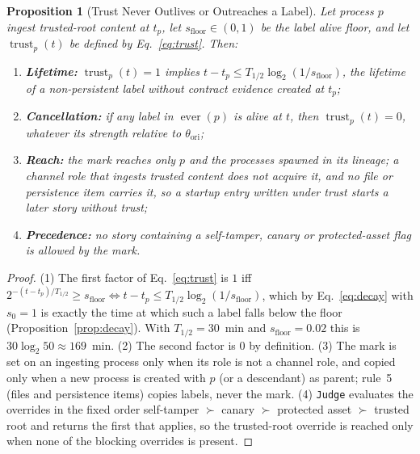 \documentclass[10pt,twocolumn,letterpaper]{article}
\makeatletter
\theoremstyle{plain}
\newtheorem{proposition}[theorem]{Proposition}
\theoremstyle{definition}
\theoremstyle{remark}
\DeclareRobustCommand{\_}{\ifmmode\nfss@text{\textunderscore}\else\textunderscore\penalty\@highpenalty\hskip\z@skip\fi}
\makeatother
\begin{document}
\begin{proposition}[Trust Never Outlives or Outreaches a Label]
\label{prop:trust}
Let process $p$ ingest trusted-root content at $t_p$, let $s_{\text{floor}} \in (0, 1)$ be the label alive floor, and let $\operatorname{trust}_p(t)$ be defined by Eq.~\eqref{eq:trust}. Then:
\begin{enumerate}[leftmargin=1.5em,itemsep=1pt,topsep=2pt]
  \item \textbf{Lifetime:} $\operatorname{trust}_p(t) = 1$ implies $t - t_p \le T_{1/2}\log_2(1/s_{\text{floor}})$, the lifetime of a non-persistent label without contract evidence created at $t_p$;
  \item \textbf{Cancellation:} if any label in $\operatorname{ever}(p)$ is alive at $t$, then $\operatorname{trust}_p(t) = 0$, whatever its strength relative to $\theta_{\text{ori}}$;
  \item \textbf{Reach:} the mark reaches only $p$ and the processes spawned in its lineage; a channel role that ingests trusted content does not acquire it, and no file or persistence item carries it, so a startup entry written under trust starts a later story without trust;
  \item \textbf{Precedence:} no story containing a self-tamper, canary or protected-asset flag is allowed by the mark.
\end{enumerate}
\end{proposition}
\begin{proof}
(1) The first factor of Eq.~\eqref{eq:trust} is $1$ iff $2^{-(t - t_p)/T_{1/2}} \ge s_{\text{floor}} \iff t - t_p \le T_{1/2}\log_2(1/s_{\text{floor}})$, which by Eq.~\eqref{eq:decay} with $s_0 = 1$ is exactly the time at which such a label falls below the floor (Proposition~\ref{prop:decay}). With $T_{1/2} = 30$~min and $s_{\text{floor}} = 0.02$ this is $30 \log_2 50 \approx 169$~min. (2) The second factor is $0$ by definition. (3) The mark is set on an ingesting process only when its role is not a channel role, and copied only when a new process is created with $p$ (or a descendant) as parent; rule~5 (files and persistence items) copies labels, never the mark. (4) \texttt{Judge} evaluates the overrides in the fixed order self-tamper $\succ$ canary $\succ$ protected asset $\succ$ trusted root and returns the first that applies, so the trusted-root override is reached only when none of the blocking overrides is present.
\end{proof}

\end{document}
